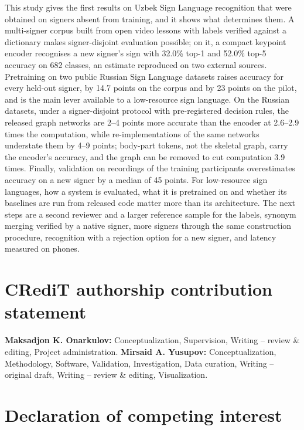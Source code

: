 \documentclass[a4paper,fleqn]{cas-dc}
\begin{document}
This study gives the first results on Uzbek Sign Language recognition that were obtained on signers absent from training, and it shows what determines them. A multi-signer corpus built from open video lessons with labels verified against a dictionary makes signer-disjoint evaluation possible; on it, a compact keypoint encoder recognises a new signer's sign with 32.0\% top-1 and 52.0\% top-5 accuracy on 682 classes, an estimate reproduced on two external sources. Pretraining on two public Russian Sign Language datasets raises accuracy for every held-out signer, by 14.7 points on the corpus and by 23 points on the pilot, and is the main lever available to a low-resource sign language. On the Russian datasets, under a signer-disjoint protocol with pre-registered decision rules, the released graph networks are 2--4 points more accurate than the encoder at 2.6--2.9 times the computation, while re-implementations of the same networks understate them by 4--9 points; body-part tokens, not the skeletal graph, carry the encoder's accuracy, and the graph can be removed to cut computation 3.9 times. Finally, validation on recordings of the training participants overestimates accuracy on a new signer by a median of 45 points. For low-resource sign languages, how a system is evaluated, what it is pretrained on and whether its baselines are run from released code matter more than its architecture. The next steps are a second reviewer and a larger reference sample for the labels, synonym merging verified by a native signer, more signers through the same construction procedure, recognition with a rejection option for a new signer, and latency measured on phones.

\hypertarget{credit-authorship-contribution-statement}{%
\section*{CRediT authorship contribution statement}\label{credit-authorship-contribution-statement}}

\textbf{Maksadjon K. Onarkulov:} Conceptualization, Supervision, Writing -- review \& editing, Project administration. \textbf{Mirsaid A. Yusupov:} Conceptualization, Methodology, Software, Validation, Investigation, Data curation, Writing -- original draft, Writing -- review \& editing, Visualization.

\hypertarget{declaration-of-competing-interest}{%
\section*{Declaration of competing interest}\label{declaration-of-competing-interest}}
\end{document}
